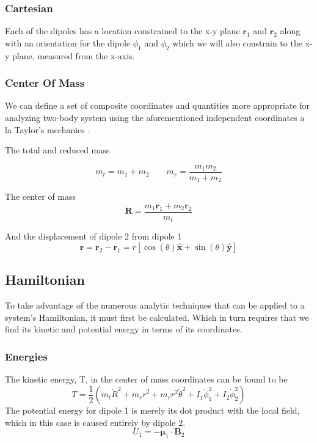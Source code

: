 \documentclass[prbg,preprint]{revtex4-1}
\begin{document}
\subsubsection{Cartesian}

Each of the dipoles has a location constrained to the x-y plane $\boldsymbol r_1$ and $\boldsymbol r_2$ along with an orientation for the dipole $\phi_1$ and $\phi_2$ which we will also constrain to the x-y plane, measured from the x-axis.
\subsubsection{Center Of Mass}
We can define a set of composite coordinates and quantities more appropriate for analyzing two-body system using the aforementioned independent coordinates a la Taylor's mechanics \cite{taylor2005classical}. 

The total and reduced mass

\begin{equation}
m_t = m_1+m_2
\qquad
m_r = \frac{m_1m_2}{m_1+m_2}
\end{equation}

The center of mass 
\begin{equation}
\boldsymbol R = \frac{m_1 \boldsymbol r_1+m_2 \boldsymbol r_2}{m_t}
\end{equation}

And the displacement of dipole 2 from dipole 1
\begin{equation}
\boldsymbol r 
=  \boldsymbol r_2-\boldsymbol r_1 
= r [\cos(\theta) \hat {\boldsymbol x}+\sin(\theta) \hat {\boldsymbol y}]
\end{equation}


\subsection{Hamiltonian}
To take advantage of the numerous analytic techniques that can be applied to a system's Hamiltonian, it must first be calculated. Which in turn requires that we find its kinetic and potential energy in terms of its coordinates.
\subsubsection{Energies}
The kinetic energy, T, in the center of mass coordinates can be found to be
\begin{equation}
T = \frac{1}{2}(
	m_t \dot R^2
	+m_r \dot r^2
	+m_r r^2 \dot \theta^2
	+ I_1 \dot \phi_1^2
	+ I_2 \dot \phi_2^2
)
\end{equation}
The potential energy for dipole 1 is merely its dot product with the local field, which in this case is caused entirely by dipole 2.
\begin{equation}
U_1 = -\boldsymbol \mu_1 \cdot \boldsymbol B_2
\end{equation}
\end{document}
